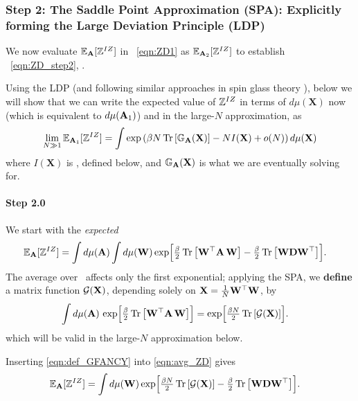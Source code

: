 \subsubsection{Step 2: The Saddle Point Approximation (SPA): Explicitly forming the Large Deviation Principle (LDP)}
\label{sxn:tanaka_step2}
We now evaluate $\mathbb{E}_{\mathbf{A}}[\mathbb{Z}^{IZ}]$ in \EQN~\ref{eqn:ZD1} as $\mathbb{E}_{\mathbf{A}_2}[\mathbb{Z}^{IZ}]$ 
to  establish \EQN~\ref{eqn:ZD_step2}, .

Using the LDP (and following similar approaches in spin glass theory \cite{PP95}),
below we will show that we can write the expected value of $\mathbb{Z}^{IZ}$ 
in terms of $d\mu(\mathbf{X})$ now (which is equivalent to $d\mu(\mathbf{A}_{1})$)
and in the large-$N$ approximation, as
\begin{equation}
  \label{eqn:LDP}
 \lim_{N \gg 1} \mathbb{E}_{\mathbf{A}_1}[\mathbb{Z}^{IZ}]=
  \int\exp\left(\beta N \mbox{}\operatorname{Tr}\left[\mathbb{G}_{\mathbf{A}}(\mathbf{X})\right]-NI(\mathbf{X})+o(N)\right)d\mu(\mathbf{X})
\end{equation}
where $I(\mathbf{X})$ is  \RateFunction, defined below,
and  $\mathbb{G}_{\mathbf{A}}(\mathbf{X})$ is what we are eventually solving for.

\paragraph{Step 2.0} We start with the \emph{expected} \PartitionFunction
\begin{align}
  \label{eqn:avg_ZD}
  \mathbb{E}_{\mathbf{A}}[\mathbb{Z}^{IZ}]
  &=
  \int d\mu(\mathbf{A})\int  d\mu({\mathbf{W}})
      \exp\Bigl[
         \tfrac{\beta}{2}\mbox{}\operatorname{Tr}\left[{\mathbf{W}}^{\top}\mathbf{A}\,{\mathbf{W}}\right]
        -\tfrac{\beta}{2}\mbox{}\operatorname{Tr}\left[{\mathbf{W}}\mathbf{D}{\mathbf{W}}^{\top}\right]
      \Bigr].
\end{align}
The average over \AMAT\ affects only the first exponential; applying the SPA, we
\textbf{define} a matrix function $\mathcal{G}(\mathbf{X})$, depending solely on
$\mathbf{X}=\frac1N{\mathbf{W}}^{\top}{\mathbf{W}}$, by
\begin{align}
  \label{eqn:def_GFANCY}
  \int d\mu(\mathbf{A})\,
        \exp\Bigl[\tfrac{\beta}{2}\mbox{}\operatorname{Tr}\left[{\mathbf{W}}^{\top}\mathbf{A}\,{\mathbf{W}}\right]\Bigr]
  &=
  \exp\Bigl[\tfrac{\beta N}{2}\mbox{}\operatorname{Tr}\left[\mathcal{G}(\mathbf{X})\right]\Bigr].
\end{align}
which will be valid in the large-$N$ approximation below.

Inserting \eqref{eqn:def_GFANCY} into \eqref{eqn:avg_ZD} gives
\begin{align}
  \label{eqn:ZD_after_Aavg}
  \mathbb{E}_{\mathbf{A}}[\mathbb{Z}^{IZ}]
  &=
  \int d\mu({\mathbf{W}})
      \exp\Bigl[
         \tfrac{\beta N}{2}\mbox{}\operatorname{Tr}\left[\mathcal{G}(\mathbf{X})\right]
        -\tfrac{\beta}{2}\mbox{}\operatorname{Tr}\left[{\mathbf{W}}\mathbf{D}{\mathbf{W}}^{\top}\right]
      \Bigr].
\end{align}

